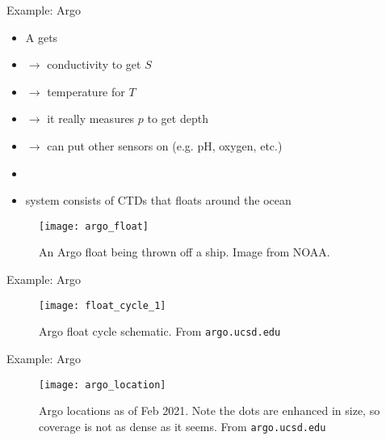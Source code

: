 \documentclass[xcolor=x11names,compress]{beamer}
\renewcommand{\(}{\begin{columns}}
\renewcommand{\)}{\end{columns}}
\newcommand{\<}[1]{\begin{column}{#1}}
\renewcommand{\>}{\end{column}}
\begin{document}

\begin{frame}{Example: Argo}

\parbox{0.55\textwidth}{
\begin{itemize}
  \item A  gets
  \item[] $\to$ conductivity to get $S$
  \item[] $\to$ temperature for $T$
  \item[] $\to$ it really measures $p$ to get depth
  \item[] $\to$ can put other sensors on (e.g. pH, oxygen, etc.)
  \item[]
  \item {} system consists of CTDs that floats around the ocean
\end{itemize}
}\hspace*{3mm}\parbox{0.38\textwidth}{
\begin{figure}
  \texttt{[image: argo\_float]}
  \caption{An Argo float being thrown off a ship. Image from NOAA.}
\end{figure}
}

\end{frame}


\begin{frame}{Example: Argo}

\begin{figure}
  \texttt{[image: float\_cycle\_1]}
  \caption{Argo float cycle schematic. From \texttt{argo.ucsd.edu}}
\end{figure}

\end{frame}


\begin{frame}{Example: Argo}

\begin{figure}
  \texttt{[image: argo\_location]}
  \caption{Argo locations as of Feb 2021. Note the dots are enhanced in size, so
  coverage is not as dense as it seems. From \texttt{argo.ucsd.edu}}
\end{figure}

\end{frame}
\end{document}

